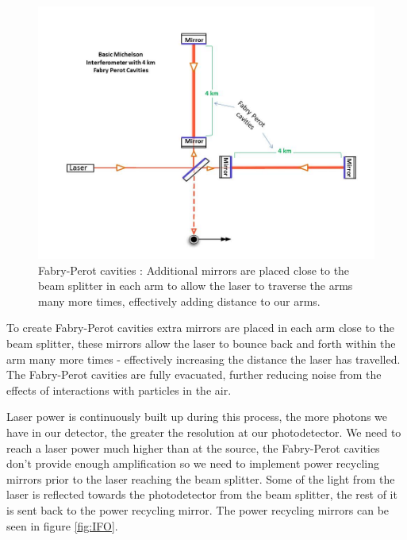 \begin{figure}
   \includegraphics[width=\textwidth]{images/gr_gw/Basic_michelson_with_FP_labeled.jpg}
   \caption{\label{fig:FP_michelson}Fabry-Perot cavities \cite{ligo_ifo}: Additional mirrors are placed close to the beam splitter in each arm to allow the laser to traverse the arms many more times, effectively adding distance to our arms.}
\end{figure}

To create Fabry-Perot cavities extra mirrors are placed in each arm close to the beam splitter, these mirrors allow the laser to bounce back and forth within the arm many more times - effectively increasing the distance the laser has travelled. The Fabry-Perot cavities are fully evacuated, further reducing noise from the effects of interactions with particles in the air.

Laser power is continuously built up during this process, the more photons we have in our detector, the greater the resolution at our photodetector. We need to reach a laser power much higher than at the source, the Fabry-Perot
cavities don't provide enough amplification so we need to implement power recycling mirrors prior to the laser reaching the beam splitter. Some of the light from the laser is reflected towards the photodetector from the beam
splitter, the rest of it is sent back to the power recycling mirror. The power recycling mirrors can be seen in figure \ref{fig:IFO}.

